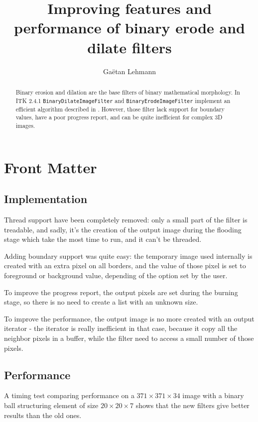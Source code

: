 \documentclass{InsightArticle}
\title{Improving features and performance of binary erode and dilate filters}
\author{Ga\"etan Lehmann}
\begin{document}
\maketitle

\ifhtml
\chapter*{Front Matter\label{front}}
\fi


\begin{abstract}
\noindent
Binary erosion and dilation are the base filters of binary mathematical morphology.
In ITK 2.4.1 \verb$BinaryDilateImageFilter$ and \verb$BinaryErodeImageFilter$ implement
an efficient algorithm described in \cite{Nikopoulos2000}. However, those filter lack
support for boundary values, have a poor progress report, and can be quite inefficient
for complex 3D images.
\end{abstract}


\section{Implementation}

Thread support have been completely removed: only a small part of the filter is treadable,
and sadly, it's the creation of the output image during the flooding stage which take the
most time to run, and it can't be threaded.

Adding boundary support was quite easy: the temporary image used internally is created
with an extra pixel on all borders, and the value of those pixel is set to foreground 
or background value, depending of the option set by the user.

To improve the progress report, the output pixels are set during the burning stage,
so there is no need to create a list with an unknown size.

To improve the performance, the output image is no more created with an output
iterator - the iterator is really inefficient in that case, because it copy all the neighbor pixels
in a buffer, while the filter need to access a small number of those pixels.

\section{Performance}

A timing test comparing performance on a $371 \times 371 \times 34$
image with a binary ball structuring element of size $20 \times 20 \times 7$ shows
that the new filters give better results than the old ones.
\end{document}
